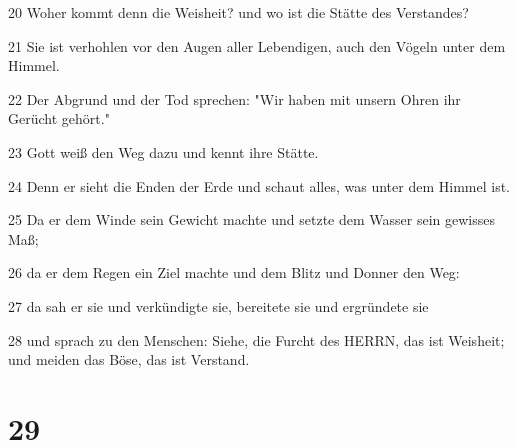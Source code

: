 \par 20 Woher kommt denn die Weisheit? und wo ist die Stätte des Verstandes?
\par 21 Sie ist verhohlen vor den Augen aller Lebendigen, auch den Vögeln unter dem Himmel.
\par 22 Der Abgrund und der Tod sprechen: "Wir haben mit unsern Ohren ihr Gerücht gehört."
\par 23 Gott weiß den Weg dazu und kennt ihre Stätte.
\par 24 Denn er sieht die Enden der Erde und schaut alles, was unter dem Himmel ist.
\par 25 Da er dem Winde sein Gewicht machte und setzte dem Wasser sein gewisses Maß;
\par 26 da er dem Regen ein Ziel machte und dem Blitz und Donner den Weg:
\par 27 da sah er sie und verkündigte sie, bereitete sie und ergründete sie
\par 28 und sprach zu den Menschen: Siehe, die Furcht des HERRN, das ist Weisheit; und meiden das Böse, das ist Verstand.

\chapter{29}

